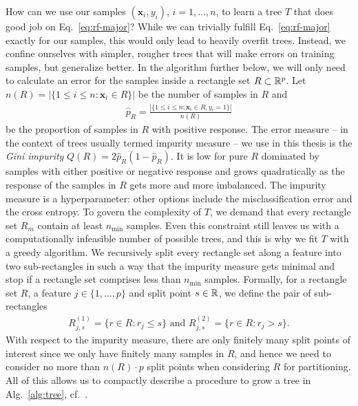 How can we use our samples $(\mathbf{x}_i, y_i)$, $i = 1, \ldots, n$, to learn a tree $T$ that does 
good job on Eq.\ \eqref{eq:rf-major}? While we can 
trivially fulfill Eq.\ \eqref{eq:rf-major} exactly for our samples, this would only lead to heavily
overfit trees. Instead, we confine ourselves with simpler, rougher trees that will make errors on 
training samples, but generalize better. 
In the algorithm further below, we will only need to calculate an error for the samples inside a 
rectangle set $R \subset \mathbb{R}^p$. Let $n(R) = |\{ 1 \leq i \leq n: \mathbf{x}_i \in R \}|$ be the number of 
samples in $R$ and
\begin{align}
    \hat{p}_R = \frac{|\{ 1 \leq i \leq n: \mathbf{x}_i \in R, y_i = 1 \}|}{n(R)}
\end{align}
be the proportion of samples in $R$ with positive response. The error measure -- in the context of 
trees usually termed impurity measure -- we use in this thesis
is the \textit{Gini impurity} $Q(R) = 2 \hat{p}_R (1 - \hat{p}_R)$. It is low for pure $R$ dominated by 
samples with either positive or negative response and grows quadratically as the response of the 
samples in $R$ gets more and more imbalanced. The impurity measure is a hyperparameter: other 
options include the misclassification error and the cross entropy. To govern the complexity of $T$,
we demand that every rectangle set $R_m$ contain at least $n_\text{min}$ samples. Even this 
constraint still leaves us with a computationally infeasible number of possible trees, and this is 
why we fit $T$ with a greedy algorithm. We recursively split every rectangle set along a 
feature into two sub-rectangles in such a way that the impurity measure gets minimal and stop if 
a rectangle set comprises less than $n_\text{min}$ samples. Formally, for a rectangle set $R$, a 
feature $j \in \{1, \ldots, p\}$ and split point $s \in \mathbb{R}$, we define 
the pair of sub-rectangles
\begin{align}
    R^{(1)}_{j, s} = \{r \in R: r_j \leq s\} \text{ and } R^{(2)}_{j, s} = \{r \in R: r_j > s\}.
\end{align}
With respect to the impurity measure, there are only finitely many split points of interest since 
we only have finitely many samples in $R$, and hence we need to consider no more than $n(R) \cdot p$ split 
points when 
considering $R$ for partitioning. All of this allows us to compactly describe a procedure to grow a 
tree in Alg.\ \ref{alg:tree}, cf.\ \cite{breiman84}.


